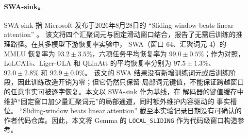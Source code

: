 \documentclass[letterpaper]{article}
\begin{document}
\begin{table}[t]
\centering
\scriptsize
\caption{事实记忆与六种基础路径的机制对照。六种基础架构的长期事实指标在当前 TinyStories 语言建模协议中未测量，因此不以“不适用”伪装成零。}
\label{tab:memory-mechanism-comparison}
%
\end{table}

\paragraph{SWA-sink。}
SWA-sink 指 Microsoft 发布于2026年8月28日的 ``Sliding-window beats linear attention'' 。
该文将四个汇聚词元与固定滑动窗口结合，报告了无需后训练的推理路径。在其多模型下游恢复率实验中，
SWA（窗口 $64$、汇聚词元 $4$）的 MMLU 恢复率为 $93.2\pm3.5\%$，六项任务平均恢复率为
$99.0\pm0.5\%$；作为对照，LoLCATs、Liger-GLA 和 QLinAtt 的平均恢复率分别为
$97.5\pm1.3\%$、$92.0\pm2.8\%$ 和 $92.9\pm0.0\%$\cite{jolicoeur2026sliding}。
该文的 SWA 结果没有新增训练词元或后训练阶段，因此训练改造开销为零；但它仍然只保留
局部词元键值，不能保证跨越窗口的任意事实可被逐字恢复。本文以 SWA-sink 作为基线，在
解码器的键值缓存中维护“固定窗口加少量汇聚词元”的局部通道，同时额外维护内容驱动的
事实槽位。
``Sliding-window beats linear attention'' 截至本实验记录日期没有可确认的
作者代码仓库。因此，本文将 Gemma 的 \texttt{LOCAL\_SLIDING} 作为代码级窗口构造参考。
\end{document}
